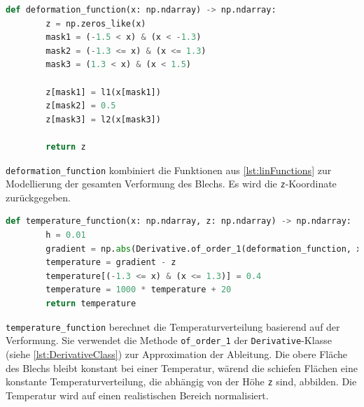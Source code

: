 \begin{lstlisting}[language=Python, caption={Deformationsfunktion}, label={lst:deformFunction}]
    def deformation_function(x: np.ndarray) -> np.ndarray:
        z = np.zeros_like(x)
        mask1 = (-1.5 < x) & (x < -1.3)
        mask2 = (-1.3 <= x) & (x <= 1.3)
        mask3 = (1.3 < x) & (x < 1.5)
    
        z[mask1] = l1(x[mask1])
        z[mask2] = 0.5
        z[mask3] = l2(x[mask3])
    
        return z
\end{lstlisting}

\texttt{deformation\_function} kombiniert die Funktionen aus \ref{lst:linFunctions} zur Modellierung der gesamten Verformung des Blechs. Es wird die \texttt{z}-Koordinate zurückgegeben.

\begin{lstlisting}[language=Python, caption={Temperaturfunktion}, label={lst:tempFunction}]
    def temperature_function(x: np.ndarray, z: np.ndarray) -> np.ndarray:
        h = 0.01
        gradient = np.abs(Derivative.of_order_1(deformation_function, x, h)) / 2.5
        temperature = gradient - z
        temperature[(-1.3 <= x) & (x <= 1.3)] = 0.4
        temperature = 1000 * temperature + 20
        return temperature
\end{lstlisting}

\texttt{temperature\_function} berechnet die Temperaturverteilung basierend auf der Verformung. Sie verwendet die Methode \texttt{of\_order\_1} der \texttt{Derivative}-Klasse (siehe \ref{lst:DerivativeClass}) zur Approximation der Ableitung. Die obere Fläche des Blechs bleibt konstant bei einer Temperatur, wärend die schiefen Flächen eine konstante Temperaturverteilung, die abhängig von der Höhe \texttt{z} sind, abbilden. Die Temperatur wird auf einen realistischen Bereich normalisiert.

